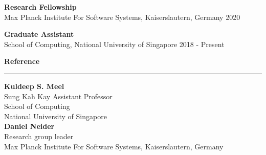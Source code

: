 \documentclass[a4paper,11pt,final]{article}
\newcommand{\Sep}{\vspace{1.5em}}
\newcommand{\SmallSep}{\vspace{0.5em}}
\begin{document}
\SmallSep
\textbf{Research Fellowship}\\
 Max Planck Institute For Software Systems, Kaiserslautern, Germany \hspace*{\fill}2020

\SmallSep
\textbf{Graduate Assistant}\\
School of Computing, National University of Singapore \hspace*{\fill} 2018  - Present

\Sep
\Large{\textbf{Reference}}\\
\noindent\rule{\textwidth}{1pt}
\normalsize
\textbf{Kuldeep S. Meel}\\
Sung Kah Kay Assistant Professor\\
School of Computing\\
National University of Singapore\\

\textbf{Daniel Neider}\\
Research group leader\\
Max Planck Institute For Software Systems, Kaiserslautern, Germany
\end{document}
